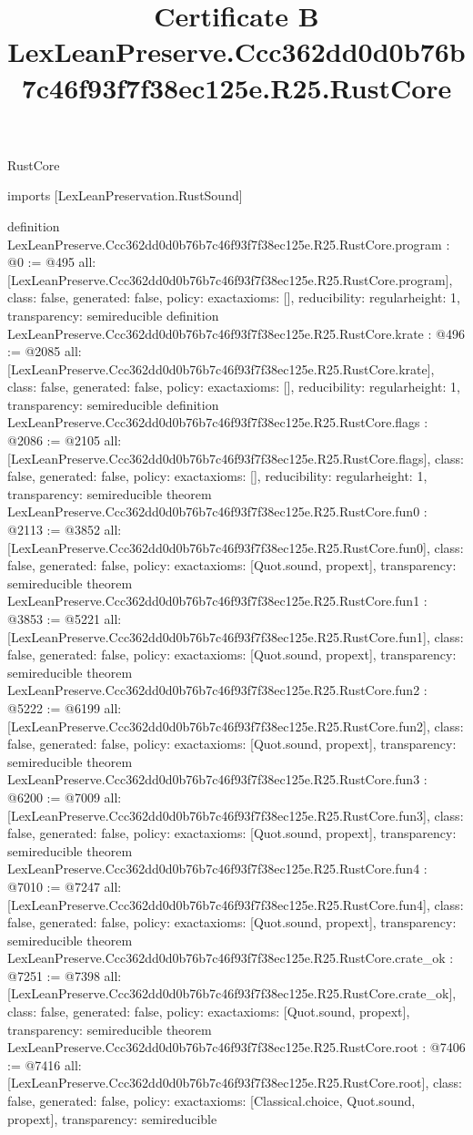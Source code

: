 \begin{lexlean}{RustCore}
\title{Certificate B LexLeanPreserve.Ccc362dd0d0b76b7c46f93f7f38ec125e.R25.RustCore}
\begin{coremodule}
imports [LexLeanPreservation.RustSound]

definition LexLeanPreserve.Ccc362dd0d0b76b7c46f93f7f38ec125e.R25.RustCore.program : @0 := @495 {
  all: [LexLeanPreserve.Ccc362dd0d0b76b7c46f93f7f38ec125e.R25.RustCore.program],
  class: false,
  generated: false,
  policy: exact{axioms: []},
  reducibility: regular{height: 1},
  transparency: semireducible
}
definition LexLeanPreserve.Ccc362dd0d0b76b7c46f93f7f38ec125e.R25.RustCore.krate : @496 := @2085 {
  all: [LexLeanPreserve.Ccc362dd0d0b76b7c46f93f7f38ec125e.R25.RustCore.krate],
  class: false,
  generated: false,
  policy: exact{axioms: []},
  reducibility: regular{height: 1},
  transparency: semireducible
}
definition LexLeanPreserve.Ccc362dd0d0b76b7c46f93f7f38ec125e.R25.RustCore.flags : @2086 := @2105 {
  all: [LexLeanPreserve.Ccc362dd0d0b76b7c46f93f7f38ec125e.R25.RustCore.flags],
  class: false,
  generated: false,
  policy: exact{axioms: []},
  reducibility: regular{height: 1},
  transparency: semireducible
}
theorem LexLeanPreserve.Ccc362dd0d0b76b7c46f93f7f38ec125e.R25.RustCore.fun0 : @2113 := @3852 {
  all: [LexLeanPreserve.Ccc362dd0d0b76b7c46f93f7f38ec125e.R25.RustCore.fun0],
  class: false,
  generated: false,
  policy: exact{axioms: [Quot.sound, propext]},
  transparency: semireducible
}
theorem LexLeanPreserve.Ccc362dd0d0b76b7c46f93f7f38ec125e.R25.RustCore.fun1 : @3853 := @5221 {
  all: [LexLeanPreserve.Ccc362dd0d0b76b7c46f93f7f38ec125e.R25.RustCore.fun1],
  class: false,
  generated: false,
  policy: exact{axioms: [Quot.sound, propext]},
  transparency: semireducible
}
theorem LexLeanPreserve.Ccc362dd0d0b76b7c46f93f7f38ec125e.R25.RustCore.fun2 : @5222 := @6199 {
  all: [LexLeanPreserve.Ccc362dd0d0b76b7c46f93f7f38ec125e.R25.RustCore.fun2],
  class: false,
  generated: false,
  policy: exact{axioms: [Quot.sound, propext]},
  transparency: semireducible
}
theorem LexLeanPreserve.Ccc362dd0d0b76b7c46f93f7f38ec125e.R25.RustCore.fun3 : @6200 := @7009 {
  all: [LexLeanPreserve.Ccc362dd0d0b76b7c46f93f7f38ec125e.R25.RustCore.fun3],
  class: false,
  generated: false,
  policy: exact{axioms: [Quot.sound, propext]},
  transparency: semireducible
}
theorem LexLeanPreserve.Ccc362dd0d0b76b7c46f93f7f38ec125e.R25.RustCore.fun4 : @7010 := @7247 {
  all: [LexLeanPreserve.Ccc362dd0d0b76b7c46f93f7f38ec125e.R25.RustCore.fun4],
  class: false,
  generated: false,
  policy: exact{axioms: [Quot.sound, propext]},
  transparency: semireducible
}
theorem LexLeanPreserve.Ccc362dd0d0b76b7c46f93f7f38ec125e.R25.RustCore.crate_ok : @7251 := @7398 {
  all: [LexLeanPreserve.Ccc362dd0d0b76b7c46f93f7f38ec125e.R25.RustCore.crate_ok],
  class: false,
  generated: false,
  policy: exact{axioms: [Quot.sound, propext]},
  transparency: semireducible
}
theorem LexLeanPreserve.Ccc362dd0d0b76b7c46f93f7f38ec125e.R25.RustCore.root : @7406 := @7416 {
  all: [LexLeanPreserve.Ccc362dd0d0b76b7c46f93f7f38ec125e.R25.RustCore.root],
  class: false,
  generated: false,
  policy: exact{axioms: [Classical.choice, Quot.sound, propext]},
  transparency: semireducible
}


\end{coremodule}
\end{lexlean}

